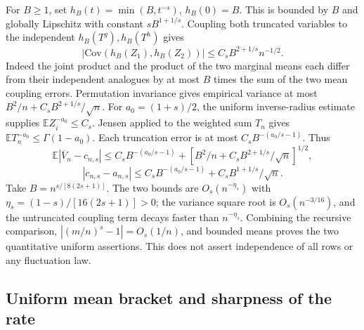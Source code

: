 \documentclass[11pt]{article}
\begin{document}
For \(B\ge1\), set \(h_B(t)=\min(B,t^{-s})\), \(h_B(0)=B\). This is bounded by \(B\) and globally Lipschitz with constant \(s B^{1+1/s}\). Coupling both truncated variables to the independent \(h_B(T^g),h_B(T^h)\) gives \[|\mathrm{Cov}(h_B(Z_1),h_B(Z_2))|\le C_s B^{2+1/s}n^{-1/2}.\] Indeed the joint product and the product of the two marginal means each differ from their independent analogues by at most \(B\) times the sum of the two mean coupling errors. Permutation invariance gives empirical variance at most \(B^2/n+C_s B^{2+1/s}/\sqrt n\). For \(a_0=(1+s)/2\), the uniform inverse-radius estimate supplies \(\mathbb E Z_i^{-a_0}\le C_s\). Jensen applied to the weighted sum \(T_n\) gives \(\mathbb E T_n^{-a_0}\le\Gamma(1-a_0)\). Each truncation error is at most \(C_s B^{-(a_0/s-1)}\). Thus \[\mathbb E|\overline V_n-c_{n,s}|\le C_s B^{-(a_0/s-1)} + [B^2/n+C_s B^{2+1/s}/\sqrt n]^{1/2},\] \[|c_{n,s}-a_{n,s}|\le C_s B^{-(a_0/s-1)} + C_s B^{1+1/s}/\sqrt n.\] Take \(B=n^{s/[8(2s+1)]}\). The two bounds are \(O_s(n^{-\eta_s})\) with \(\eta_s=(1-s)/[16(2s+1)]>0\); the variance square root is \(O_s(n^{-3/16})\), and the untruncated coupling term decays faster than \(n^{-\eta_s}\). Combining the recursive comparison, \(|(m/n)^s-1|=O_s(1/n)\), and bounded means proves the two quantitative uniform assertions. This does not assert independence of all rows or any fluctuation law.

\subsection{Uniform mean bracket and sharpness of the rate}\label{uniform-mean-bracket-and-sharpness-of-the-rate}
\end{document}
